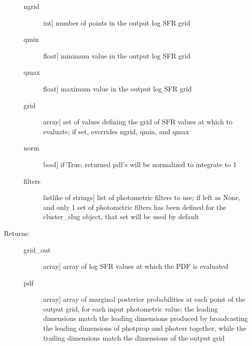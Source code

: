 \documentclass[letterpaper,10pt,english]{sphinxmanual}
\begin{document}
\begin{fulllineitems}
\begin{fulllineitems}
\begin{description}
\begin{description}
\item[{ngrid}] \leavevmode{[}int{]}
number of points in the output log SFR grid

\item[{qmin}] \leavevmode{[}float{]}
minimum value in the output log SFR grid

\item[{qmax}] \leavevmode{[}float{]}
maximum value in the output log SFR grid

\item[{grid}] \leavevmode{[}array{]}
set of values defining the grid of SFR values at which
to evaluate; if set, overrides ngrid, qmin, and qmax

\item[{norm}] \leavevmode{[}bool{]}
if True, returned pdf's will be normalized to integrate
to 1

\item[{filters}] \leavevmode{[}listlike of strings{]}
list of photometric filters to use; if left as None, and
only 1 set of photometric filters has been defined for
the cluster\_slug object, that set will be used by
default

\end{description}

\item[{Returns:}] \leavevmode\begin{description}
\item[{grid\_out}] \leavevmode{[}array{]}
array of log SFR values at which the PDF is evaluated

\item[{pdf}] \leavevmode{[}array{]}
array of marginal posterior probabilities at each point
of the output grid, for each input photometric value;
the leading dimensions match the leading dimensions
produced by broadcasting the leading dimensions of
photprop and photerr together, while the trailing
dimensions match the dimensions of the output grid

\end{description}

\end{description}

\end{fulllineitems}


\end{fulllineitems}
\end{document}
